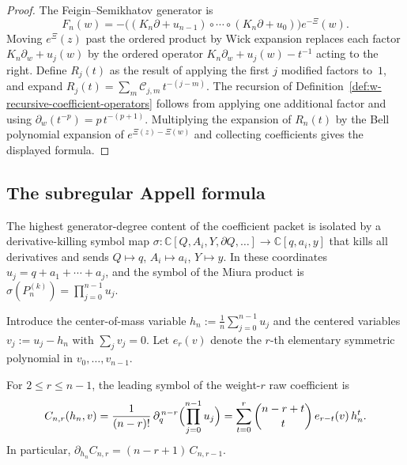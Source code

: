\begin{proof}
The Feigin--Semikhatov generator is
\[
F_n(w) = -\bigl((K_n\partial + u_{n-1})
  \circ \cdots \circ (K_n\partial + u_0)\bigr) e^{-\Xi}(w).
\]
Moving $e^{\Xi}(z)$ past the ordered product by Wick expansion
replaces each factor $K_n\partial_w + u_j(w)$ by the ordered
operator $K_n\partial_w + u_j(w) - t^{-1}$ acting to the right.
Define $R_j(t)$ as the result of applying the first $j$ modified
factors to~$1$, and expand
$R_j(t) = \sum_m \mathcal{C}_{j,m}\,t^{-(j-m)}$.  The recursion
of Definition~\ref{def:w-recursive-coefficient-operators} follows
from applying one additional factor and using
$\partial_w(t^{-p}) = p\,t^{-(p+1)}$.  Multiplying the expansion of
$R_n(t)$ by the Bell polynomial expansion of
$e^{\Xi(z) - \Xi(w)}$ and collecting coefficients gives the
displayed formula.
\end{proof}

\subsection{The subregular Appell formula}
\label{subsec:subregular-appell}

The highest generator-degree content of the coefficient packet is
isolated by a derivative-killing symbol map
$\sigma \colon \mathbb{C}[Q, A_i, Y, \partial Q, \dots]
\to \mathbb{C}[q, a_i, y]$
that kills all derivatives and sends $Q \mapsto q$, $A_i \mapsto a_i$,
$Y \mapsto y$.  In these coordinates
$u_j = q + a_1 + \cdots + a_j$, and the symbol of the Miura product
is $\sigma(P_n^{(k)}) = \prod_{j=0}^{n-1} u_j$.

Introduce the center-of-mass variable
$h_n := \frac{1}{n}\sum_{j=0}^{n-1} u_j$ and the centered variables
$v_j := u_j - h_n$ with $\sum_j v_j = 0$.  Let $e_r(v)$ denote the
$r$-th elementary symmetric polynomial in $v_0, \dots, v_{n-1}$.

\begin{theorem}
\label{thm:w-subregular-appell}
For $2 \le r \le n-1$, the leading symbol of the weight-$r$ raw
coefficient is
\begin{equation}
\label{eq:w-subregular-appell}
C_{n,r}(h_n, v)
= \frac{1}{(n-r)!}\,\partial_q^{\,n-r}
  \Bigl(\prod_{j=0}^{n-1} u_j\Bigr)
= \sum_{t=0}^{r} \binom{n-r+t}{t}\,e_{r-t}(v)\,h_n^t.
\end{equation}
In particular, $\partial_{h_n} C_{n,r} = (n-r+1)\,C_{n,r-1}$.
\end{theorem}

